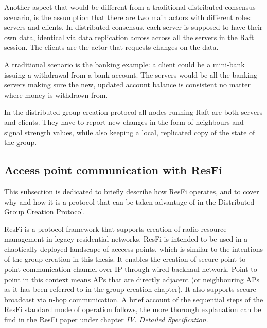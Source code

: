 Another aspect that would be different from a traditional distributed consensus scenario, is the assumption that there are two main actors with different roles: servers and clients.
In distributed consensus, each server is supposed to have their own data, identical via data replication across across all the servers in the Raft session. The clients are the actor that requests 
changes on the data.

A traditional scenario is the banking example: a client could be a mini-bank issuing a withdrawal from a bank account. The servers would be all the banking servers making sure the new,
updated account balance is consistent no matter where money is withdrawn from. 

In the distributed group creation protocol all nodes running Raft are both servers and clients. They have to report new changes in the form of neighbours and signal strength values,
while also keeping a local, replicated copy of the state of the group.

\subsection{Access point communication with ResFi}
This subsection is dedicated to briefly describe how ResFi operates, and to cover why and how it is a protocol that can be taken advantage of in the Distributed Group Creation Protocol. 

ResFi is a protocol framework that supports creation of radio resource management in legacy residential networks. ResFi is intended to be used in  a chaotically deployed landscape of acccess points,
which is similar to the intentions of the group creation in this thesis. It enables the creation of secure point-to-point communication channel over IP through wired backhaul network. 
Point-to-point in this context means APs that are directly adjacent (or neighbouring APs as it has been referred to in the group creation chapter).
It also supports secure broadcast via n-hop communication. A brief account of the sequential steps of the ResFi standard mode of operation follows,
the more thorough explanation can be find in the ResFi paper \cite{resfi} under chapter \textit{IV. Detailed Specification}.


